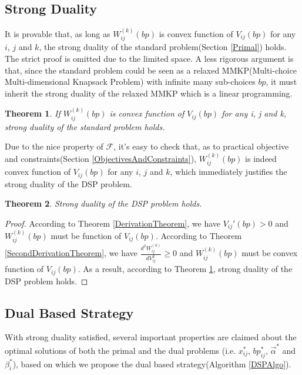 \documentclass{article}
\newtheorem{theorem}{Theorem}[section]
\newcommand{\sx}{x_{ij}}
\newcommand{\sbp}{bp_{ij}}
\newcommand{\sV}{V_{ij}}
\newcommand{\sW}{W_{ij}^{(k)}}
\newcommand{\sbeta}{\beta_i}
\newcommand{\valpha}{\vec{\alpha}}
\newcommand{\uff}{\mathscr{F}}
\begin{document}
\subsection{Strong Duality}

It is provable that, as long as $\sW(bp)$ is convex function of $\sV(bp)$ for any $i$, $j$ and $k$,
    the strong duality of the standard problem(Section \ref{Primal}) holds.
The strict proof is omitted due to the limited space.
A less rigorous argument is that, since the standard problem could be seen as
    a relaxed MMKP(Multi-choice Multi-dimensional Knapsack Problem) with infinite many sub-choices $bp$,
    it must inherit the strong duality of the relaxed MMKP which is a linear programming.

\begin{theorem} \label{StrongDualityTheorem}
If $\sW(bp)$ is convex function of $\sV(bp)$ for any i, j and k, strong duality of the standard problem holds.
\end{theorem}

Due to the nice property of $\uff$, it's easy to check that,
    as to practical objective and constraints(Section \ref{ObjectivesAndConstraints}),
    $\sW(bp)$ is indeed convex function of $\sV(bp)$ for any $i$, $j$ and $k$,
    which immediately justifies the strong duality of the DSP problem.

\begin{theorem} \label{DSPStrongDualityTheorem}
Strong duality of the DSP problem holds.
\end{theorem}

\begin{proof}
According to Theorem \ref{DerivationTheorem}, we have $\sV'(bp)>0$ and $\sW(bp)$ must be function of $\sV(bp)$.
According to Theorem \ref{SecondDerivationTheorem}, we have $\frac{d^2\sW}{d\sV^2} \ge 0$ and $\sW(bp)$ must be convex function of $\sV(bp)$.
As a result, according to Theorem \ref{StrongDualityTheorem}, strong duality of the DSP problem holds.
\end{proof}

\subsection{Dual Based Strategy} \label{DSPDualBasedStrategy}

With strong duality satisfied, several important properties
    are claimed about the optimal solutions of both the primal and the dual problems
    (i.e. $\sx^*$, $\sbp^*$, $\valpha^*$ and $\sbeta^*$),
    based on which we propose the dual based strategy(Algorithm \ref{DSPAlgo}).
\end{document}
